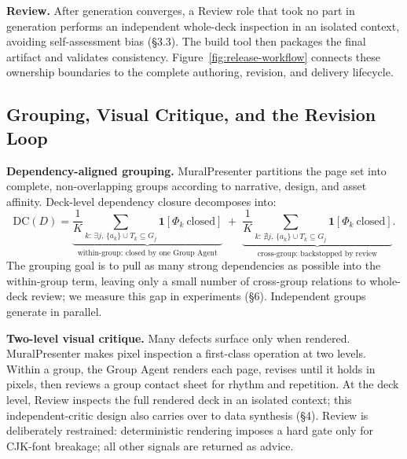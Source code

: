 \textbf{Review.} After generation converges, a Review role that took no part in generation performs an independent whole-deck inspection in an isolated context, avoiding self-assessment bias (§3.3). The build tool then packages the final artifact and validates consistency. Figure~\ref{fig:release-workflow} connects these ownership boundaries to the complete authoring, revision, and delivery lifecycle.



\subsection{Grouping, Visual Critique, and the Revision Loop}

\textbf{Dependency-aligned grouping.} MuralPresenter partitions the page set into complete, non-overlapping groups according to narrative, design, and asset affinity. Deck-level dependency closure decomposes into: \[
\mathrm{DC}(D)=\underbrace{\frac{1}{K}\!\!\sum_{k:\,\exists j,\,\{a_k\}\cup T_k\subseteq G_j}\!\!\mathbf{1}[\Phi_k\ \text{closed}]}_{\text{within-group: closed by one Group Agent}}
\;+\;
\underbrace{\frac{1}{K}\!\!\sum_{k:\,\nexists j,\,\{a_k\}\cup T_k\subseteq G_j}\!\!\mathbf{1}[\Phi_k\ \text{closed}]}_{\text{cross-group: backstopped by review}}.
\] The grouping goal is to pull as many strong dependencies as possible into the within-group term, leaving only a small number of cross-group relations to whole-deck review; we measure this gap in experiments (§6). Independent groups generate in parallel.

\textbf{Two-level visual critique.} Many defects surface only when rendered. MuralPresenter makes pixel inspection a first-class operation at two levels. Within a group, the Group Agent renders each page, revises until it holds in pixels, then reviews a group contact sheet for rhythm and repetition. At the deck level, Review inspects the full rendered deck in an isolated context; this independent-critic design also carries over to data synthesis (§4). Review is deliberately restrained: deterministic rendering imposes a hard gate only for CJK-font breakage; all other signals are returned as advice.

